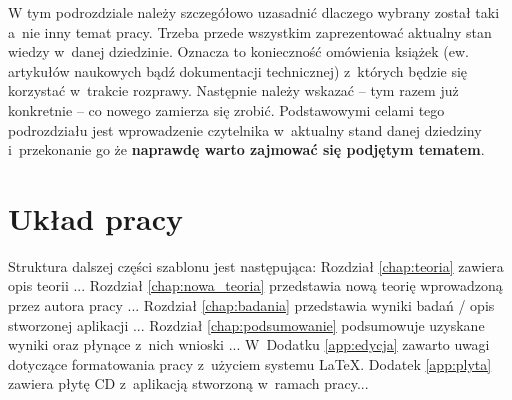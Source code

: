 W tym podrozdziale należy szczegółowo uzasadnić dlaczego wybrany został taki
a~nie inny temat pracy. Trzeba przede wszystkim zaprezentować aktualny stan
wiedzy w~danej dziedzinie. Oznacza to konieczność omówienia książek
(ew. artykułów naukowych bądź dokumentacji technicznej) z~których będzie się
korzystać w~trakcie rozprawy. Następnie należy wskazać -- tym razem już
konkretnie -- co nowego zamierza się zrobić. Podstawowymi celami tego
podrozdziału jest wprowadzenie czytelnika w~aktualny stand danej dziedziny
i~przekonanie go że \textbf{naprawdę warto zajmować się podjętym tematem}.

\section{Układ pracy}

Struktura dalszej części szablonu jest następująca: Rozdział \ref{chap:teoria}
zawiera opis teorii ... Rozdział \ref{chap:nowa_teoria} przedstawia nową teorię
wprowadzoną przez autora pracy ...  Rozdział \ref{chap:badania} przedstawia
wyniki badań / opis stworzonej aplikacji ... Rozdział \ref{chap:podsumowanie}
podsumowuje uzyskane wyniki oraz płynące z~nich wnioski ... W~Dodatku
\ref{app:edycja} zawarto uwagi dotyczące formatowania pracy z~użyciem systemu
\LaTeX. Dodatek \ref{app:plyta} zawiera płytę CD z~aplikacją stworzoną w~ramach
pracy...
